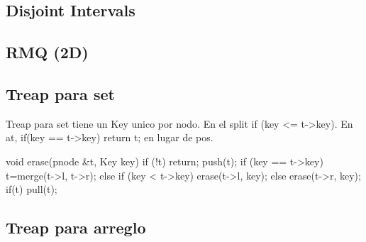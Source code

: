 \subsection{Disjoint Intervals}
\subsection{RMQ (2D)}
\subsection{Treap para set}
Treap para set tiene un Key unico por nodo. En el split if (key \textless = t-\textgreater key). 
En at, if(key == t-\textgreater key) return t; en lugar de pos.
\begin{code}
void erase(pnode &t, Key key) {
    if (!t) return; push(t);
    if (key == t->key) t=merge(t->l, t->r);
    else if (key < t->key) erase(t->l, key);
    else erase(t->r, key);
    if(t) pull(t);}
\end{code}
\subsection{Treap para arreglo}
